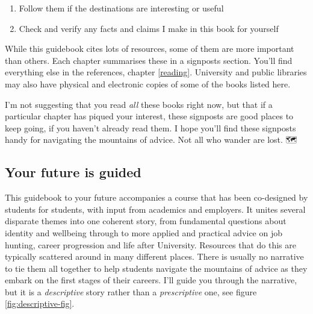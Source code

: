 \documentclass[
]{book}
\providecommand{\tightlist}{%
  \setlength{\itemsep}{0pt}\setlength{\parskip}{0pt}}
\begin{document}
\begin{enumerate}
\def\labelenumi{\arabic{enumi}.}
\tightlist
\item
  Follow them if the destinations are interesting or useful
\item
  Check and verify any facts and claims I make in this book for yourself
\end{enumerate}

While this guidebook cites lots of resources, some of them are more important than others. Each chapter summarises these in a signposts section. You'll find everything else in the references, chapter \ref{reading}. University and public libraries may also have physical and electronic copies of some of the books listed here.

I'm not suggesting that you read \emph{all} these books right now, but that if a particular chapter has piqued your interest, these signposts are good places to keep going, if you haven't already read them. I hope you'll find these signposts handy for navigating the mountains of advice. Not all who wander are lost. 🗺️🧭

\hypertarget{study}{%
\subsection{Your future is guided}\label{study}}

This guidebook to your future accompanies a course that has been co-designed by students for students, with input from academics and employers. It unites several disparate themes into one coherent story, from fundamental questions about identity and wellbeing through to more applied and practical advice on job hunting, career progression and life after University. Resources that do this are typically scattered around in many different places. There is usually no narrative to tie them all together to help students navigate the mountains of advice as they embark on the first stages of their careers. I'll guide you through the narrative, but it is a \emph{descriptive} story rather than a \emph{prescriptive} one, see figure \ref{fig:descriptive-fig}.
\end{document}
